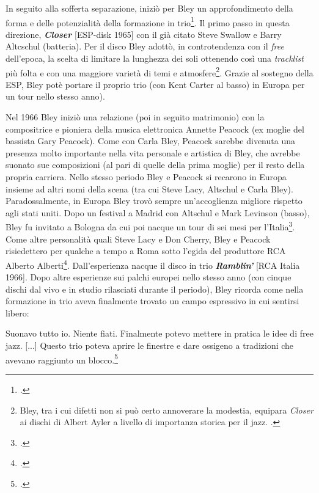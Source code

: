 In seguito alla sofferta separazione, iniziò per Bley un approfondimento della forma e delle potenzialità della formazione in trio\footcite[98]{stopping}. Il primo passo in questa direzione, \textit{\textbf{Closer}} [ESP-disk 1965] con il già citato Steve Swallow e Barry Altcschul (batteria). Per il disco Bley adottò, in controtendenza con il \textit{free} dell'epoca, la scelta di limitare la lunghezza dei soli ottenendo così una \textit{tracklist} più folta e con una maggiore varietà di temi e atmosfere\footnote{Bley, tra i cui difetti non si può certo annoverare la modestia, equipara \textit{Closer} ai dischi di Albert Ayler a livello di importanza storica per il jazz. \cite[100]{stopping}.}. Grazie al sostegno della ESP, Bley potè portare il proprio trio (con Kent Carter al basso) in Europa per un tour nello stesso anno).\par
Nel 1966 Bley iniziò una relazione (poi in seguito matrimonio) con la compositrice e pioniera della musica elettronica Annette Peacock (ex moglie del bassista Gary Peacock). Come con Carla Bley, Peacock sarebbe divenuta una presenza molto importante nella vita personale e artistica di Bley, che avrebbe suonato sue composizioni (al pari di quelle della prima moglie) per il resto della propria carriera. Nello stesso periodo Bley e Peacock si recarono in Europa insieme ad altri nomi della scena (tra cui Steve Lacy, Altschul e Carla Bley).\\
Paradossalmente, in Europa Bley trovò sempre un'accoglienza migliore rispetto agli stati uniti. Dopo un festival a Madrid con Altschul e Mark Levinson (basso), Bley fu invitato a Bologna da cui poi nacque un tour di sei mesi per l'Italia\footcite[102]{stopping}. Come altre personalità quali Steve Lacy e Don Cherry, Bley e Peacock risiedettero per qualche a tempo a Roma sotto l'egida del produttore RCA Alberto Alberti\footcite[104]{stopping}. Dall'esperienza nacque il disco in trio \textit{\textbf{Ramblin'}} [RCA Italia 1966]. Dopo altre esperienze sui palchi europei nello stesso anno (con cinque dischi dal vivo e in studio rilasciati durante il periodo), Bley ricorda come nella formazione in trio aveva finalmente trovato un campo espressivo in cui sentirsi libero:
\begin{fquote}
	Suonavo tutto io. Niente fiati. Finalmente potevo mettere in pratica le  idee di free jazz. [...] Questo trio poteva aprire le finestre e dare ossigeno a tradizioni che avevano raggiunto un blocco.\footcite[106]{stopping}
\end{fquote}







\appendix

